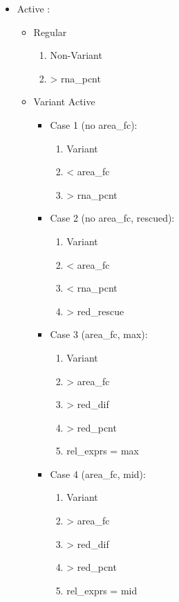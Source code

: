 \documentclass[11pt]{article}
\begin{document}
\begin{itemize}
\item Active :

\begin{itemize}
\item Regular
\begin{enumerate}
\item Non-Variant
\item > rna\_pcnt
\end{enumerate}

\item Variant Active
\begin{itemize}
\item Case 1 (no area\_fc):
\begin{enumerate}
\item Variant
\item < area\_fc
\item > rna\_pcnt
\end{enumerate}
\item Case 2 (no area\_fc, rescued):
\begin{enumerate}
\item Variant
\item < area\_fc
\item < rna\_pcnt
\item > red\_rescue
\end{enumerate}
\item Case 3 (area\_fc, max):
\begin{enumerate}
\item Variant
\item > area\_fc
\item > red\_dif
\item > red\_pcnt
\item rel\_exprs = max
\end{enumerate}
\item Case 4 (area\_fc, mid):
\begin{enumerate}
\item Variant
\item > area\_fc
\item > red\_dif
\item > red\_pcnt
\item rel\_exprs = mid
\end{enumerate}
\end{itemize}


\end{itemize}
\end{itemize}
\end{document}
